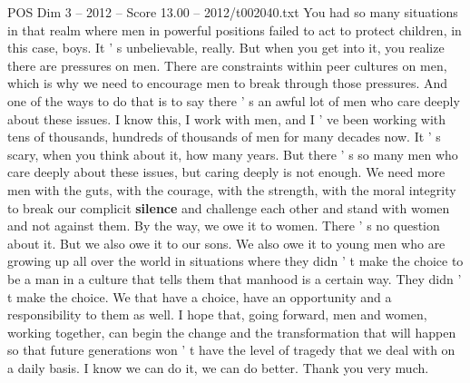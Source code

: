 \begin{textsample}{POS Dim 3 – 2012 – Score 13.00 – 2012/t002040.txt}
You had so many situations in that realm where men in powerful positions failed to act to protect children, in this case, boys.
It ' s unbelievable, really.
But when you get into it, you realize there are pressures on men.
There are constraints within peer cultures on men, which is why we need to encourage men to break through those pressures.
And one of the ways to do that is to say there ' s an awful lot of men who care deeply about these issues.
I know this, I work with men, and I ' ve been working with tens of thousands, hundreds of thousands of men for many decades now.
It ' s scary, when you think about it, how many years.
But there ' s so many men who care deeply about these issues, but caring deeply is not enough.
We need more men with the guts, with the courage, with the strength, with the moral integrity to break our complicit \textbf{silence} and challenge each other and stand with women and not against them.
By the way, we owe it to women.
There ' s no question about it.
But we also owe it to our sons.
We also owe it to young men who are growing up all over the world in situations where they didn ' t make the choice to be a man in a culture that tells them that manhood is a certain way.
They didn ' t make the choice.
We that have a choice, have an opportunity and a responsibility to them as well.
I hope that, going forward, men and women, working together, can begin the change and the transformation that will happen so that future generations won ' t have the level of tragedy that we deal with on a daily basis.
I know we can do it, we can do better.
Thank you very much.

\end{textsample}
